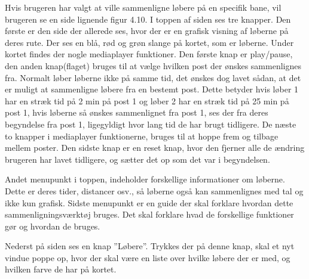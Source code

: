 Hvis brugeren har valgt at ville sammenligne løbere på en specifik bane, vil brugeren se en side lignende figur 4.10. I toppen af siden ses tre knapper. Den første er den side der allerede ses, hvor der er en grafisk visning af løberne på deres rute. Der ses en blå, rød og grøn slange på kortet, som er løberne. Under kortet findes der nogle mediaplayer funktioner. Den første knap er play/pause, den anden knap(flaget) bruges til at vælge hvilken post der ønskes sammenlignes fra. Normalt løber løberne ikke på samme tid, det ønskes dog lavet sådan, at det er muligt at sammenligne løbere fra en bestemt post. Dette betyder hvis løber 1 har en stræk tid på 2 min på post 1 og løber 2 har en stræk tid på 25 min på post 1, hvis løberne så ønskes sammenlignet fra post 1, ses der fra deres begyndelse fra post 1, ligegyldigt hvor lang tid de har brugt tidligere. De næste to knapper i mediaplayer funktionerne, bruges til at hoppe frem og tilbage mellem poster. Den sidste knap er en reset knap, hvor den fjerner alle de ændring brugeren har lavet tidligere, og sætter det op som det var i begyndelsen.  

Andet menupunkt i toppen, indeholder forskellige informationer om løberne. Dette er deres tider, distancer osv., så løberne også kan sammenlignes med tal og ikke kun grafisk. Sidste menupunkt er en guide der skal forklare hvordan dette sammenligningsværktøj bruges. Det skal forklare hvad de forskellige funktioner gør og hvordan de bruges.

Nederst på siden ses en knap ”Løbere”. Trykkes der på denne knap, skal et nyt vindue poppe op, hvor der skal være en liste over hvilke løbere der er med, og hvilken farve de har på kortet.
